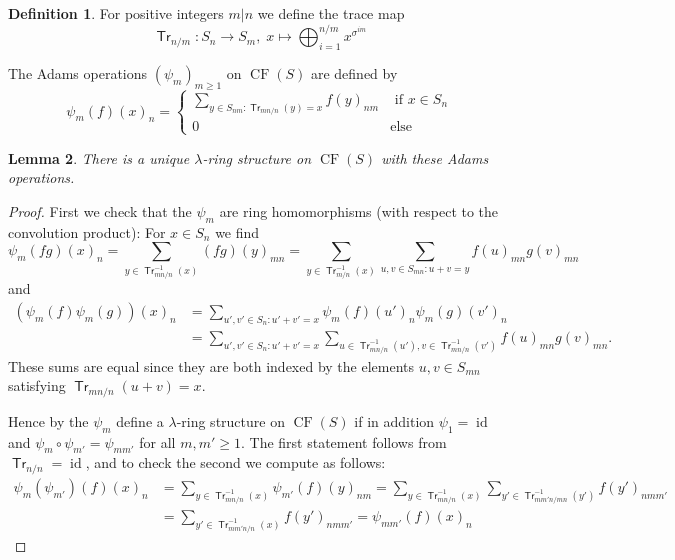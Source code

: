 \documentclass{article}
\DeclareMathOperator{\id}{id}
\DeclareMathOperator{\Tr}{\mathsf{Tr}}
\DeclareMathOperator{\mcf}{CF}
\theoremstyle{definition}
\newtheorem{definition}{Definition}[section]
\theoremstyle{plain}
\newtheorem{lemma}[definition]{Lemma}
\begin{document}
\begin{definition}
For positive integers $m | n$ we define the trace map 
\begin{equation*}
    \Tr_{n/m} \colon S_n \to S_m,\; x \mapsto \bigoplus_{i=1}^{n/m} x^{\sigma^{im}} 
\end{equation*}




The Adams operations $(\psi_m)_{  m \geq 1}$ on  $\mcf(S)$ are defined by 
\[ \psi_m(f)(x)_n =
\begin{cases}
    \sum_{y \in S_{nm}\colon \Tr_{mn/n}(y)=x} f(y)_{nm} & \text{ if } x \in S_n \\
    0 & \text{else}
\end{cases}   \]
\end{definition}

\begin{lemma}
There is a unique $\lambda$-ring structure on $\mcf(S)$ with these Adams operations.
\end{lemma}
\begin{proof}
    First we check that the $\psi_m$ are ring homomorphisms (with respect to the convolution product): 
    For $x \in S_n$ we find
    \begin{equation*}
        \psi_m(fg)(x)_n=\sum_{y \in \Tr_{mn/n}^{-1}(x)} (fg)(y)_{mn} =\sum_{y \in \Tr_{m/n}^{-1}(x)} \sum_{u,v \in S_{mn}\colon u+v=y } f(u)_{mn} g(v)_{mn}
    \end{equation*}
    and
    \begin{align*}
        (\psi_m(f)\psi_m(g))(x)_n &=\sum_{u', v'\in S_n\colon u'+v'=x}\psi_m(f)(u')_n\psi_m(g)(v')_n\\ &=\sum_{u', v'\in S_n\colon u'+v'=x} \sum_{u \in \Tr_{mn/n}^{-1}(u'), v \in \Tr_{mn/n}^{-1}(v') }f(u)_{mn} g(v)_{mn}.
    \end{align*}
    These sums are equal since they are both indexed by the elements $u, v \in S_{mn}$ satisfying $\Tr_{mn/n}(u+v)=x$.

    Hence by \cite[Section 2.1]{Mo19} the $\psi_m$ define a $\lambda$-ring structure on $\mcf(S)$ if in addition $\psi_1=\id$ and $\psi_m\circ\psi_{m'}=\psi_{m m'}$ for all $m,m' \geq 1$. The first statement follows from $\Tr_{n/n}=\id$, and to check the second we compute as follows:
    \begin{align*}
        \psi_m(\psi_{m'})(f)(x)_n&=\sum_{y \in \Tr_{mn/n}^{-1}(x)} \psi_{m'}(f)(y)_{nm} = \sum_{y \in \Tr_{mn/n}^{-1}(x)} \sum_{y'\in \Tr_{mm'n/mn}^{-1}(y')} f(y')_{nmm'}\\
        &= \sum_{y' \in \Tr_{mm'n/n}^{-1}(x)}f(y')_{nmm'}=\psi_{mm'}(f)(x)_n
    \end{align*}
    
\end{proof}
\end{document}
